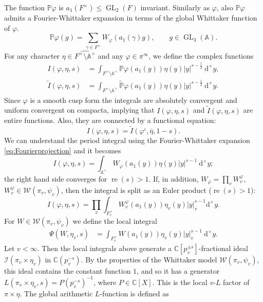 \documentclass[a4paper,11pt]{amsart}
\theoremstyle{definition}
\newcommand{\A}{\mathbb{A}}
\newcommand{\gelle}{\operatorname{GL}}
\newcommand{\real}{\operatorname{re}}
\newcommand{\CC}{\mathbb{C}}
\begin{document}
The function $\mathbb{P}\varphi$ is $a_1(F^\times)\leqslant \gelle_2(F)$ invariant. Similarly as $\varphi$, also $\mathbb{P}\varphi$ admits a Fourier-Whittaker expansion in terms of the global Whittaker function of $\varphi$.
\begin{equation}\label{eq:Fourierprojection}\mathbb{P}\varphi(g) = \sum_{\gamma \in F^{\times}}W_{\varphi}(a_1(\gamma)g), \qquad g\in \gelle_3(\A). \end{equation}
For any character $\eta \in \widehat{F^{\times}\setminus \A^{\times}}$ and any $\varphi \in \pi^{\infty}$, we define the complex functions \begin{align*}I(\varphi,\eta,s) &= \int_{F^{\times}\setminus\A^{\times}} \mathbb{P}\varphi(a_1(y))\eta(y)\vert{y}\vert^{s-\frac{1}{2}}\ \mathrm{d}^{\times}y,\\ \tilde{I}(\varphi,\eta,s)&= \int_{F^{\times}\setminus\A^{\times}}\tilde{\mathbb{P}}\varphi(a_1(y))\eta(y)\vert{y}\vert^{s-\frac{1}{2}}\ \mathrm{d}^{\times}y. \end{align*}
Since $\varphi$ is a smooth cusp form the integrals are absolutely convergent and uniform convergent on compacta, implying that $I(\varphi,\eta,s)$ and $\tilde{I}(\varphi,\eta,s)$ are entire functions. Also, they are connected by a functional equation:
\begin{equation}\label{eq:fctequations}I(\varphi,\eta,s) = \tilde{I}(\varphi^{\iota},\overline{\eta},1-s).\end{equation}
We can understand the period integral using the Fourier-Whittaker expansion \eqref{eq:Fourierprojection} and it becomes
\begin{equation*}
    I(\varphi,\eta,s) = \int_{\A^{\times}} W_{\varphi}(a_1(y))\eta(y)\vert{y}\vert^{s-1}\ \mathrm{d}^{\times}y; 
\end{equation*}
the right hand side converges for $\real(s)>1$. If, in addition, $W_{\varphi} = \prod_{v}W^{\varphi}_{v}$, $W_{v}^{\varphi} \in \mathcal{W}(\pi_v,\psi_v)$, then the integral is split as an Euler product ($\real(s)>1$): \begin{equation*}
    I(\varphi,\eta,s) = \prod_{v} \int_{F_v^{\times}}W_{v}^{\varphi}(a_1(y))\eta_v(y)\vert{y}\vert_v^{s-1}\mathrm{d}^{\times}y.
\end{equation*}
For $W \in \mathcal{W}(\pi_v,\psi_v)$ we define the local integral 
\begin{align*}\Psi(W,\eta_v,s) &= \int_{F_v^{\times}}W(a_1(y))\eta_v(y)\vert{y}\vert_v^{s-1}\ \mathrm{d}^{\times}y.
\end{align*}
Let $v<\infty$. Then the local integrals above generate a $\CC[p_v^{\pm s}]$-fractional ideal $\mathcal{I}(\pi_v\times\eta_v)$ in $\CC(p_v^{-s})$. By the properties of the Whittaker model $\mathcal{W}(\pi_v,\psi_v)$, this ideal contains the constant function $1$, and so it has a generator $L(\pi_v\times \eta_v,s) = P(p_v^{-s})^{-1}$, where $P \in \CC[X]$. This is the local $v$-$L$ factor of $\pi \times \eta$. The global arithmetic $L$-function is defined as 
\end{document}
